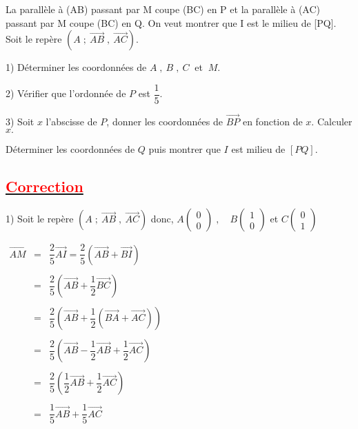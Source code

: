\documentclass[12pt]{article}
\begin{document}
La parallèle à (AB) passant par M coupe (BC) en P et la parallèle à (AC) passant par M coupe (BC) en Q. On veut montrer que I est le milieu de [PQ]. Soit le repère $(A\;;\ \overrightarrow{AB}\;,\ \overrightarrow{AC}).$

1) Déterminer les coordonnées de $A\;,\ B\;,\ C\ $ et $\ M.$

2) Vérifier que l'ordonnée de $P$ est $\dfrac{1}{5}.$

3) Soit $x$ l'abscisse de $P$, donner les coordonnées de $\overrightarrow{BP}$ en fonction de $x$. Calculer $x.$

Déterminer les coordonnées de $Q$ puis montrer que $I$ est milieu de $[PQ].$
\subsection*{\underline{\textcolor{red}{\textbf{Correction}}}}

1) Soit le repère $(A\;;\ \overrightarrow{AB}\;,\ \overrightarrow{AC})$ donc, $A\begin{pmatrix} 0 \\ 0\end{pmatrix}\;,\quad B\begin{pmatrix} 1 \\ 0\end{pmatrix}$ et $C\begin{pmatrix} 0 \\ 1\end{pmatrix}$

$\begin{array}{rcl}\overrightarrow{AM}&=&\dfrac{2}{5}\overrightarrow{AI}=\dfrac{2}{5}(\overrightarrow{AB}+\overrightarrow{BI}) \\ \\ &=&\dfrac{2}{5}\left(\overrightarrow{AB}+\dfrac{1}{2}\overrightarrow{BC}\right)\\ \\ &=&\dfrac{2}{5}\left(\overrightarrow{AB}+\dfrac{1}{2}\left(\overrightarrow{BA}+\overrightarrow{AC}\right)\right)\\ \\ &=&\dfrac{2}{5}\left(\overrightarrow{AB}-\dfrac{1}{2}\overrightarrow{AB}+\dfrac{1}{2}\overrightarrow{AC}\right)\\ \\ &=&\dfrac{2}{5}\left(\dfrac{1}{2}\overrightarrow{AB}+\dfrac{1}{2}\overrightarrow{AC}\right)\\ \\ &=&\dfrac{1}{5}\overrightarrow{AB}+\dfrac{1}{5}\overrightarrow{AC}\end{array}$
\end{document}
